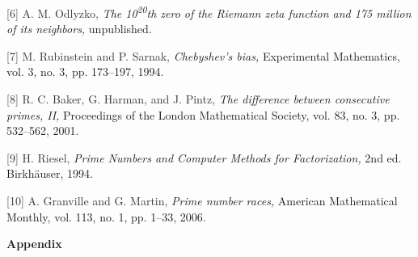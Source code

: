 \documentclass{aomart}
\begin{document}
\textcolor[HTML]{333333}{[6] A. M. Odlyzko, }\textit{The 10\textsuperscript{20}th zero of the Riemann zeta function and 175 million of its neighbors,} unpublished.

\vspace{1\baselineskip}

\textcolor[HTML]{333333}{[7] M. Rubinstein and P. Sarnak, }\textit{Chebyshev’s bias,} Experimental Mathematics, vol. 3, no. 3, pp. 173–197, 1994.

\vspace{1\baselineskip}

\textcolor[HTML]{333333}{[8] R. C. Baker, G. Harman, and J. Pintz, }\textit{The difference between consecutive primes, II,} Proceedings of the London Mathematical Society, vol. 83, no. 3, pp. 532–562, 2001.

\vspace{1\baselineskip}

\textcolor[HTML]{333333}{[9] H. Riesel, }\textit{Prime Numbers and Computer Methods for Factorization,} 2nd ed. Birkhäuser, 1994.

\vspace{1\baselineskip}

\textcolor[HTML]{333333}{[10] A. Granville and G. Martin, }\textit{Prime number races,} American Mathematical Monthly, vol. 113, no. 1, pp. 1–33, 2006.




\newpage
\appendix
\centering
\textbf{Appendix}


\vspace{1\baselineskip}
\end{document}
